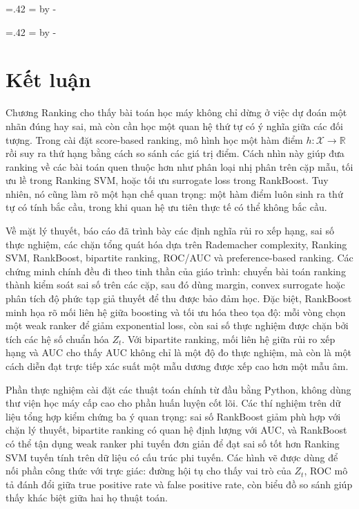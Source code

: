 \documentclass[12pt,a4paper]{article}
\makeatletter
\newcommand{\sectionbreakifneeded}{%
  \par
  \begingroup
  \dimen@=.42\textheight
  \dimen@ii=\pagegoal
  \advance\dimen@ii by -\pagetotal
  \ifdim\dimen@>\dimen@ii\newpage\fi
  \endgroup
}
\makeatother
\begin{document}

\sectionbreakifneeded


\sectionbreakifneeded
\section{Kết luận}

Chương Ranking cho thấy bài toán học máy không chỉ dừng ở việc dự đoán một nhãn đúng hay sai, mà còn cần học một quan hệ thứ tự có ý nghĩa giữa các đối tượng. Trong cài đặt score-based ranking, mô hình học một hàm điểm $h:\mathcal{X}\to\mathbb{R}$ rồi suy ra thứ hạng bằng cách so sánh các giá trị điểm. Cách nhìn này giúp đưa ranking về các bài toán quen thuộc hơn như phân loại nhị phân trên cặp mẫu, tối ưu lề trong Ranking SVM, hoặc tối ưu surrogate loss trong RankBoost. Tuy nhiên, nó cũng làm rõ một hạn chế quan trọng: một hàm điểm luôn sinh ra thứ tự có tính bắc cầu, trong khi quan hệ ưu tiên thực tế có thể không bắc cầu.

Về mặt lý thuyết, báo cáo đã trình bày các định nghĩa rủi ro xếp hạng, sai số thực nghiệm, các chặn tổng quát hóa dựa trên Rademacher complexity, Ranking SVM, RankBoost, bipartite ranking, ROC/AUC và preference-based ranking. Các chứng minh chính đều đi theo tinh thần của giáo trình: chuyển bài toán ranking thành kiểm soát sai số trên các cặp, sau đó dùng margin, convex surrogate hoặc phân tích độ phức tạp giả thuyết để thu được bảo đảm học. Đặc biệt, RankBoost minh họa rõ mối liên hệ giữa boosting và tối ưu hóa theo tọa độ: mỗi vòng chọn một weak ranker để giảm exponential loss, còn sai số thực nghiệm được chặn bởi tích các hệ số chuẩn hóa $Z_t$. Với bipartite ranking, mối liên hệ giữa rủi ro xếp hạng và AUC cho thấy AUC không chỉ là một độ đo thực nghiệm, mà còn là một cách diễn đạt trực tiếp xác suất một mẫu dương được xếp cao hơn một mẫu âm.

Phần thực nghiệm cài đặt các thuật toán chính từ đầu bằng Python, không dùng thư viện học máy cấp cao cho phần huấn luyện cốt lõi. Các thí nghiệm trên dữ liệu tổng hợp kiểm chứng ba ý quan trọng: sai số RankBoost giảm phù hợp với chặn lý thuyết, bipartite ranking có quan hệ định lượng với AUC, và RankBoost có thể tận dụng weak ranker phi tuyến đơn giản để đạt sai số tốt hơn Ranking SVM tuyến tính trên dữ liệu có cấu trúc phi tuyến. Các hình vẽ được dùng để nối phần công thức với trực giác: đường hội tụ cho thấy vai trò của $Z_t$, ROC mô tả đánh đổi giữa true positive rate và false positive rate, còn biểu đồ so sánh giúp thấy khác biệt giữa hai họ thuật toán.
\end{document}
